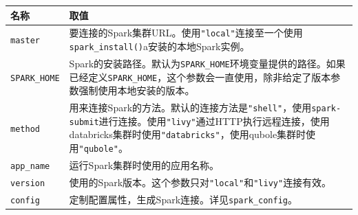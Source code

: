 \documentclass[
]{article}
\begin{document}
\begin{longtable}[]{@{}ll@{}}
\toprule
\begin{minipage}[b]{0.43\columnwidth}\raggedright
名称\strut
\end{minipage} & \begin{minipage}[b]{0.51\columnwidth}\raggedright
取值\strut
\end{minipage}\tabularnewline
\midrule
\endhead
\begin{minipage}[t]{0.43\columnwidth}\raggedright
\texttt{master}\strut
\end{minipage} & \begin{minipage}[t]{0.51\columnwidth}\raggedright
要连接的Spark集群URL。使用\texttt{"local"}连接至一个使用\texttt{spark\_install()}a安装的本地Spark实例。\strut
\end{minipage}\tabularnewline
\begin{minipage}[t]{0.43\columnwidth}\raggedright
\texttt{SPARK\_HOME}\strut
\end{minipage} & \begin{minipage}[t]{0.51\columnwidth}\raggedright
Spark的安装路径。默认为\texttt{SPARK\_HOME}环境变量提供的路径。如果已经定义\texttt{SPARK\_HOME}，这个参数会一直使用，除非给定了版本参数强制使用本地安装的版本。\strut
\end{minipage}\tabularnewline
\begin{minipage}[t]{0.43\columnwidth}\raggedright
\texttt{method}\strut
\end{minipage} & \begin{minipage}[t]{0.51\columnwidth}\raggedright
用来连接Spark的方法。默认的连接方法是\texttt{"shell"}，使用\texttt{spark-submit}进行连接。使用\texttt{"livy"}通过HTTP执行远程连接，使用databricks集群时使用\texttt{"databricks"}，使用qubole集群时使用\texttt{"qubole"}。\strut
\end{minipage}\tabularnewline
\begin{minipage}[t]{0.43\columnwidth}\raggedright
\texttt{app\_name}\strut
\end{minipage} & \begin{minipage}[t]{0.51\columnwidth}\raggedright
运行Spark集群时使用的应用名称。\strut
\end{minipage}\tabularnewline
\begin{minipage}[t]{0.43\columnwidth}\raggedright
\texttt{version}\strut
\end{minipage} & \begin{minipage}[t]{0.51\columnwidth}\raggedright
使用的Spark版本。这个参数只对\texttt{"local"}和\texttt{"livy"}连接有效。\strut
\end{minipage}\tabularnewline
\begin{minipage}[t]{0.43\columnwidth}\raggedright
\texttt{config}\strut
\end{minipage} & \begin{minipage}[t]{0.51\columnwidth}\raggedright
定制配置属性，生成Spark连接。详见\texttt{spark\_config}。\strut
\end{minipage}\tabularnewline
\bottomrule
\end{longtable}
\end{document}
